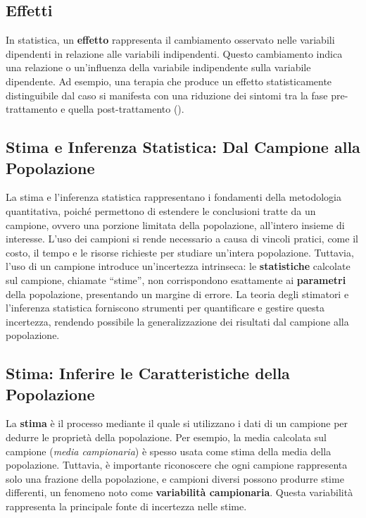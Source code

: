 \documentclass[
  letterpaper,
]{krantz}
\begin{document}
\subsection{Effetti}\label{effetti}

In statistica, un \textbf{effetto} rappresenta il cambiamento osservato
nelle variabili dipendenti in relazione alle variabili indipendenti.
Questo cambiamento indica una relazione o un'influenza della variabile
indipendente sulla variabile dipendente. Ad esempio, una terapia che
produce un effetto statisticamente distinguibile dal caso si manifesta
con una riduzione dei sintomi tra la fase pre-trattamento e quella
post-trattamento ().

\subsection{Stima e Inferenza Statistica: Dal Campione alla
Popolazione}\label{stima-e-inferenza-statistica-dal-campione-alla-popolazione}

La stima e l'inferenza statistica rappresentano i fondamenti della
metodologia quantitativa, poiché permettono di estendere le conclusioni
tratte da un campione, ovvero una porzione limitata della popolazione,
all'intero insieme di interesse. L'uso dei campioni si rende necessario
a causa di vincoli pratici, come il costo, il tempo e le risorse
richieste per studiare un'intera popolazione. Tuttavia, l'uso di un
campione introduce un'incertezza intrinseca: le \textbf{statistiche}
calcolate sul campione, chiamate ``stime'', non corrispondono
esattamente ai \textbf{parametri} della popolazione, presentando un
margine di errore. La teoria degli stimatori e l'inferenza statistica
forniscono strumenti per quantificare e gestire questa incertezza,
rendendo possibile la generalizzazione dei risultati dal campione alla
popolazione.

\subsection{Stima: Inferire le Caratteristiche della
Popolazione}\label{stima-inferire-le-caratteristiche-della-popolazione}

La \textbf{stima} è il processo mediante il quale si utilizzano i dati
di un campione per dedurre le proprietà della popolazione. Per esempio,
la media calcolata sul campione (\emph{media campionaria}) è spesso
usata come stima della media della popolazione. Tuttavia, è importante
riconoscere che ogni campione rappresenta solo una frazione della
popolazione, e campioni diversi possono produrre stime differenti, un
fenomeno noto come \textbf{variabilità campionaria}. Questa variabilità
rappresenta la principale fonte di incertezza nelle stime.
\end{document}
